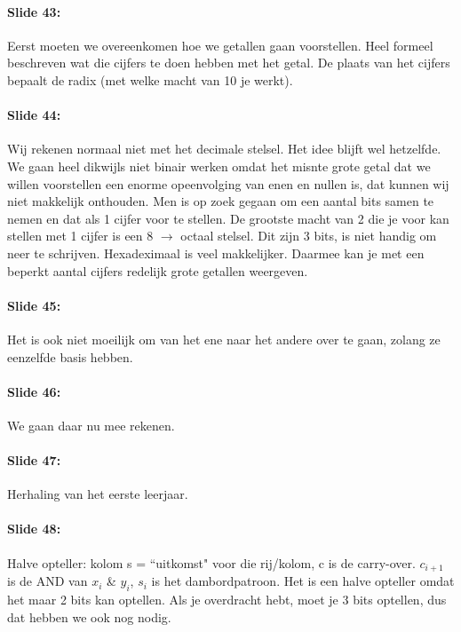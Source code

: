 \documentclass[10pt,a4paper]{book}
\begin{document}
\paragraph{Slide 43:} Eerst moeten we overeenkomen hoe we getallen gaan voorstellen. Heel formeel beschreven wat die cijfers te doen hebben met het getal. De plaats van het cijfers bepaalt de radix (met welke macht van 10 je werkt). 

\paragraph{Slide 44:} Wij rekenen normaal niet met het decimale stelsel. Het idee blijft wel hetzelfde. We gaan heel dikwijls niet binair werken omdat het misnte grote getal dat we willen voorstellen een enorme opeenvolging van enen en nullen is, dat kunnen wij niet makkelijk onthouden. Men is op zoek gegaan om een aantal bits samen te nemen en dat als 1 cijfer voor te stellen. De grootste macht van 2 die je voor kan stellen met 1 cijfer is een 8 $\rightarrow$ octaal stelsel. Dit zijn 3 bits, is niet handig om neer te schrijven. Hexadeximaal is veel makkelijker. Daarmee kan je met een beperkt aantal cijfers redelijk grote getallen weergeven.

\paragraph{Slide 45:} Het is ook niet moeilijk om van het ene naar het andere over te gaan, zolang ze eenzelfde basis hebben.

\paragraph{Slide 46:} We gaan daar nu mee rekenen. 

\paragraph{Slide 47:} Herhaling van het eerste leerjaar.

\paragraph{Slide 48:} Halve opteller: kolom s = ``uitkomst" voor die rij/kolom, c is de carry-over. $c_{i+1}$ is de AND van $x_i$ \& $y_i$, $s_i$ is het dambordpatroon. Het is een halve opteller omdat het maar 2 bits kan optellen. Als je overdracht hebt, moet je 3 bits optellen, dus dat hebben we ook nog nodig. 
\end{document}
